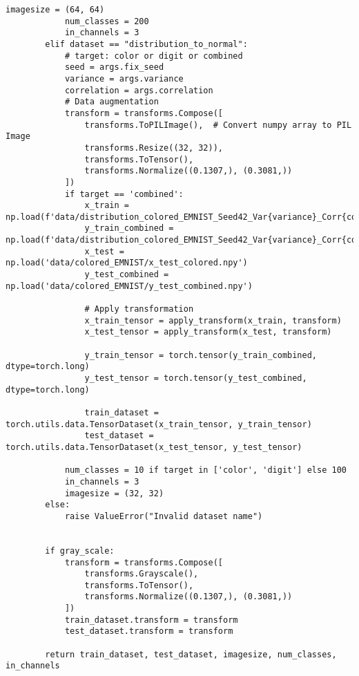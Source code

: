 \begin{lstlisting}[style=pythonstyle, caption={メインコード}]
            imagesize = (64, 64)
            num_classes = 200
            in_channels = 3
        elif dataset == "distribution_to_normal":
            # target: color or digit or combined
            seed = args.fix_seed
            variance = args.variance
            correlation = args.correlation
            # Data augmentation
            transform = transforms.Compose([
                transforms.ToPILImage(),  # Convert numpy array to PIL Image
                transforms.Resize((32, 32)),
                transforms.ToTensor(),
                transforms.Normalize((0.1307,), (0.3081,))
            ])
            if target == 'combined':
                x_train = np.load(f'data/distribution_colored_EMNIST_Seed42_Var{variance}_Corr{correlation}/x_train_colored.npy')
                y_train_combined = np.load(f'data/distribution_colored_EMNIST_Seed42_Var{variance}_Corr{correlation}/y_train_combined.npy')
                x_test = np.load('data/colored_EMNIST/x_test_colored.npy')
                y_test_combined = np.load('data/colored_EMNIST/y_test_combined.npy')
                
                # Apply transformation
                x_train_tensor = apply_transform(x_train, transform)
                x_test_tensor = apply_transform(x_test, transform)
                
                y_train_tensor = torch.tensor(y_train_combined, dtype=torch.long)
                y_test_tensor = torch.tensor(y_test_combined, dtype=torch.long)
                
                train_dataset = torch.utils.data.TensorDataset(x_train_tensor, y_train_tensor)
                test_dataset = torch.utils.data.TensorDataset(x_test_tensor, y_test_tensor)
        
            num_classes = 10 if target in ['color', 'digit'] else 100
            in_channels = 3
            imagesize = (32, 32)
        else:
            raise ValueError("Invalid dataset name")
            
    
        if gray_scale:
            transform = transforms.Compose([
                transforms.Grayscale(),
                transforms.ToTensor(),
                transforms.Normalize((0.1307,), (0.3081,))
            ])
            train_dataset.transform = transform
            test_dataset.transform = transform  
    
        return train_dataset, test_dataset, imagesize, num_classes, in_channels
    

\end{lstlisting}
